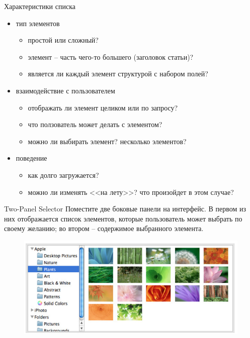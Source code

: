 \documentclass{beamer}
\begin{document}
\begin{frame}{Характеристики списка}
	\begin{itemize}
		\item тип элементов
		\begin{itemize}
			\item простой или сложный?
			\item элемент -- часть чего-то большего (заголовок статьи)?
			\item является ли каждый элемент структурой с набором полей?
		\end{itemize}	
		\item взаимодействие с пользователем
		\begin{itemize}
			\item отображать ли элемент целиком или по запросу?
			\item что ползователь может делать с элементом?
			\item можно ли выбирать элемент? несколько элементов?
		\end{itemize}
		\item поведение
		\begin{itemize}
			\item как долго загружается?
			\item можно ли изменять <<на лету>>? что произойдет в этом случае?
		\end{itemize}		
	\end{itemize}
\end{frame}	

\begin{frame}[t]{Two-Panel Selector}
	Поместите две боковые панели на интерфейс. В первом из них отображается список элементов, которые
пользователь может выбрать по своему желанию; во втором -- содержимое выбранного элемента.
	\begin{figure}[h]
		\centering
		\includegraphics[scale=0.6]{images/lec07-pic49.png}
	\end{figure}
\end{frame}	
\end{document}
